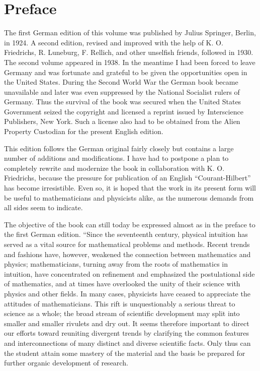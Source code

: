 \chapter*{Preface}

The first German edition of this volume was published by Julius Springer, Berlin, in 1924. A second edition, revised and improved with the help of K. O. Friedrichs, R. Luneburg, F. Rellich, and other unselfish friends, followed in 1930. The second volume appeared in 1938. In the meantime I had been forced to leave Germany and was fortunate and grateful to be given the opportunities open in the United States. During the Second World War the German book became unavailable and later was even suppressed by the National Socialist rulers of Germany. Thus the survival of the book was secured when the United States Government seized the copyright and licensed a reprint issued by Interscience Publishers, New York. Such a license also had to be obtained from the Alien Property Custodian for the present English edition.

This edition follows the German original fairly closely but contains a large number of additions and modifications. I have had to postpone a plan to completely rewrite and modernize the book in collaboration with K. O. Friedrichs, because the pressure for publication of an English ``Courant-Hilbert'' has become irresistible. Even so, it is hoped that the work in its present form will be useful to mathematicians and physicists alike, as the numerous demands from all sides seem to indicate.

The objective of the book can still today be expressed almost as in the preface to the first German edition. ``Since the seventeenth century, physical intuition has served as a vital source for mathematical problems and methods. Recent trends and fashions have, however, weakened the connection between mathematics and physics; mathematicians, turning away from the roots of mathematics in intuition, have concentrated on refinement and emphasized the postulational side of mathematics, and at times have overlooked the unity of their science with physics and other fields. In many cases, physicists have ceased to appreciate the attitudes of mathematicians. This rift is unquestionably a serious threat to science as a whole; the broad stream of scientific development may split into smaller and smaller rivulets and dry out. It seems therefore important to direct our efforts toward reuniting divergent trends by clarifying the common features and interconnections of many distinct and diverse scientific facts. Only thus can the student attain some mastery of the material and the basis be prepared for further organic development of research.

